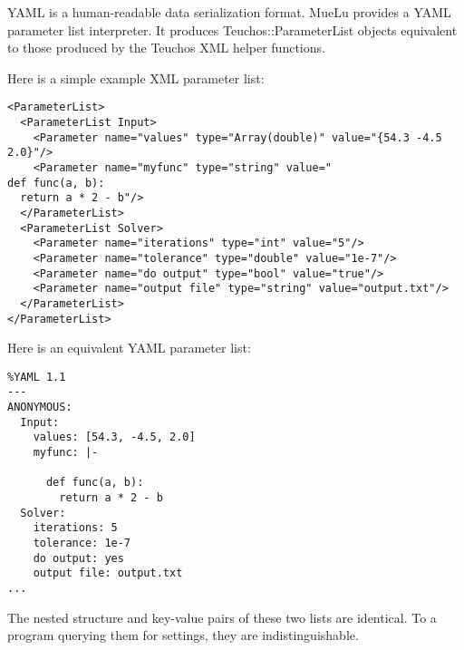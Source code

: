 YAML is a human-readable data serialization format. MueLu provides a
YAML parameter list interpreter. It produces Teuchos::ParameterList
objects equivalent to those produced by the Teuchos XML helper functions.

Here is a simple example XML parameter list:
\begin{verbatim}
<ParameterList>
  <ParameterList Input>
    <Parameter name="values" type="Array(double)" value="{54.3 -4.5 2.0}"/>
    <Parameter name="myfunc" type="string" value="
def func(a, b):
  return a * 2 - b"/>
  </ParameterList>
  <ParameterList Solver>
    <Parameter name="iterations" type="int" value="5"/>
    <Parameter name="tolerance" type="double" value="1e-7"/>
    <Parameter name="do output" type="bool" value="true"/>
    <Parameter name="output file" type="string" value="output.txt"/>
  </ParameterList>
</ParameterList>
\end{verbatim}

Here is an equivalent YAML parameter list:
\begin{verbatim}
%YAML 1.1
---
ANONYMOUS:
  Input:
    values: [54.3, -4.5, 2.0]
    myfunc: |-

      def func(a, b):
        return a * 2 - b
  Solver:
    iterations: 5
    tolerance: 1e-7
    do output: yes
    output file: output.txt
...
\end{verbatim}

The nested structure and key-value pairs of these two lists are identical.
To a program querying them for settings, they are indistinguishable.

